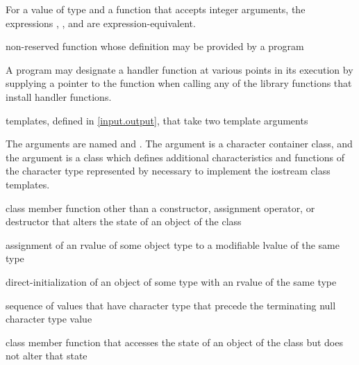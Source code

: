 \begin{example}
For a value  of type 
and a function  that accepts integer arguments,
the expressions
,
,
and
are expression-equivalent.
\end{example}

%
non-reserved function whose definition may be provided by a \Cpp{} program

\begin{defnote}
A \Cpp{} program may designate a handler function at various points in its execution by
supplying a pointer to the function when calling any of the library functions that install
handler functions.
\end{defnote}

templates, defined in \ref{input.output},
that take two template arguments

\begin{defnote}
The arguments are named
and
.
The argument
is a character container class,
and the argument
is a class which defines additional characteristics and functions
of the character type represented by
necessary to implement the iostream class templates.
\end{defnote}

%
class member function other than a constructor,
assignment operator, or destructor
that alters the state of an object of the class

%
assignment of an rvalue of some object type to a modifiable lvalue of the same type

%
direct-initialization of an object of some type with an rvalue of the same type

%
%
sequence of values that have
character type
that precede the terminating null character type
value

%
class member function that accesses the state of an object of the class
but does not alter that state

